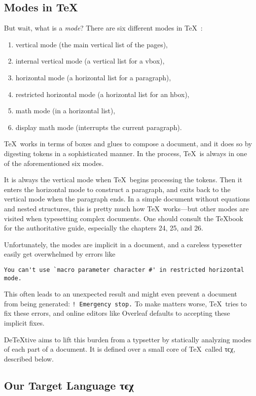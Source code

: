 \documentclass[a4paper]{article}
\newcommand*{\tex}{τϵχ}
\begin{document}
\subsection{Modes in \TeX}
But wait, what is a \emph{mode}?
There are six different modes in \TeX~\cite{texbook}:
\begin{enumerate}
\item vertical mode (the main vertical list of the pages),
\item internal vertical mode (a vertical list for a vbox),
\item horizontal mode (a horizontal list for a paragraph),
\item restricted horizontal mode (a horizontal list for an hbox),
\item math mode (in a horizontal list),
\item display math mode (interrupts the current paragraph).
\end{enumerate}
\TeX\ works in terms of boxes and glues to compose a document, and it does so by digesting tokens in a sophisticated manner.
In the process, \TeX\ is always in one of the aforementioned six modes.

It is always the vertical mode when \TeX\ begins processing the tokens.
Then it enters the horizontal mode to construct a paragraph, and exits back to the vertical mode when the paragraph ends.
In a simple document without equations and nested structures, this is pretty much how \TeX\ works---but other modes are visited when typesetting complex documents.
One should consult the \TeX{}book~\cite{texbook} for the authoritative guide, especially the chapters 24, 25, and 26.

Unfortunately, the modes are implicit in a document, and a careless typesetter easily get overwhelmed by errors like
\begin{verbatim}
You can't use `macro parameter character #' in restricted horizontal mode.
\end{verbatim}
This often leads to an unexpected result and might even prevent a document from being generated: \verb/! Emergency stop./
To make matters worse, \TeX\ tries to fix these errors, and online editors like \textsf{Overleaf} defaults to accepting these implicit fixes.

De\TeX{}tive aims to lift this burden from a typsetter by statically analyzing modes of each part of a document.
It is defined over a small core of \TeX\ called \tex, described below.

\subsection{Our Target Language \tex}
\end{document}
